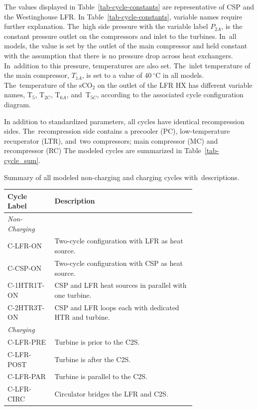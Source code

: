 \documentclass[sustainability,article,accept,moreauthors,pdftex]{Definitions/mdpi}
\begin{document}
\begin{paracol}{2}
The values displayed in Table~\ref{tab-cycle-constants} are representative of CSP and the Westinghouse LFR. 
{In Table~\ref{tab-cycle-constants}, variable names require further explanation. The~high side pressure with the variable label $P_{2A}$, is the constant pressure outlet on the compressors and inlet to the turbines. In~all models, the value is set by the outlet of the main compressor and held constant with the assumption that there is no pressure drop across heat exchangers. In~addition to this pressure, temperatures are also set. The~inlet temperature of the main compressor, $T_{1A}$, is set to a value of $40~^{\circ}$C in all models. The~temperature of the sCO$_2$ on the outlet of the LFR HX has different variable names, T$_5$, T$_{2C}$, T$_{6A}$, and~T$_{5C}$, according to the associated cycle configuration diagram.}{}


In addition to standardized parameters, all cycles have identical recompression sides. The~recompression side contains a  %
{precooler (PC), low-temperature recuperator (LTR), and~two compressors; main compressor (MC) and recompressor (RC)}
The modeled cycles are summarized in Table~\ref{tab-cycle_sum}.

\begin{specialtable}[H] 
    \caption{Summary of all modeled non-charging and charging cycles with~descriptions. \label{tab-cycle_sum}}
    \begin{tabular}{lL{0.75\linewidth}}
    \toprule
    \textbf{Cycle Label} & \textbf{Description}\\
    \midrule
    \textit{Non-Charging}\\
    C-LFR-ON & Two-cycle configuration with LFR as heat source.\\
    C-CSP-ON & Two-cycle configuration with CSP as heat source.\\
    C-1HTR1T-ON & CSP and LFR heat sources in parallel with one turbine.\\
    C-2HTR3T-ON & CSP and LFR loops each with dedicated HTR and turbine.\\
    \midrule
    \textit{Charging}\\
    C-LFR-PRE & Turbine is prior to the C2S.\\
    C-LFR-POST & Turbine is after the C2S.\\
    C-LFR-PAR & Turbine is parallel to the C2S.\\
    C-LFR-CIRC & Circulator bridges the LFR and C2S.\\
    \bottomrule
    \end{tabular}
\end{specialtable}


\end{paracol}
\end{document}
